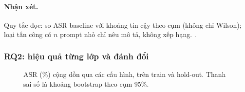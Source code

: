 \begin{table}[t]
\centering\small
\caption[ASR theo loại tấn công]{ASR (\%) theo prompt, theo loại tấn công, ở baseline và ở cấu hình cuối; $n$ là số prompt của nhóm (nhóm nhỏ chỉ để mô tả).}\label{tab:by-type}
\end{table}


\paragraph{Nhận xét.} Quy tắc đọc: so ASR baseline với khoảng tin cậy theo cụm (không chỉ Wilson); loại tấn công có $n$ prompt nhỏ chỉ nêu mô tả, không xếp hạng. .

\subsubsection{RQ2: hiệu quả từng lớp và đánh đổi}\label{sec:res-rq2}
\begin{figure}[t]
\centering
{}
\caption[ASR cộng dồn qua các cấu hình]{ASR (\%) cộng dồn qua các cấu hình, trên train và hold-out. Thanh sai số là khoảng bootstrap theo cụm 95\%.}\label{fig:cumulative}
\end{figure}

\begin{table}[t]
\centering\small
\caption[ASR cộng dồn: mức giảm theo từng lớp]{ASR cộng dồn: mức giảm tuyệt đối so với cấu hình liền trước, kèm khoảng bootstrap theo cụm.}\label{tab:cumulative}
\end{table}

\begin{table}[t]
\centering\small
\caption{Ablation: ASR theo prompt khi chỉ bật từng lớp (\texttt{only\_Lk}) và mức giảm so với baseline.}\label{tab:ablation}
\end{table}

\begin{table}[t]
\centering\small
\caption[Tập benign: từ chối oan và utility]{Tập benign: tỉ lệ từ chối oan ($\FRR$), phần do từng lớp chặn, phần do mô hình tự từ chối, và utility (benign bị chặn tính 0; cột cuối chỉ tính các lượt không bị chặn).}\label{tab:benign}
\end{table}

